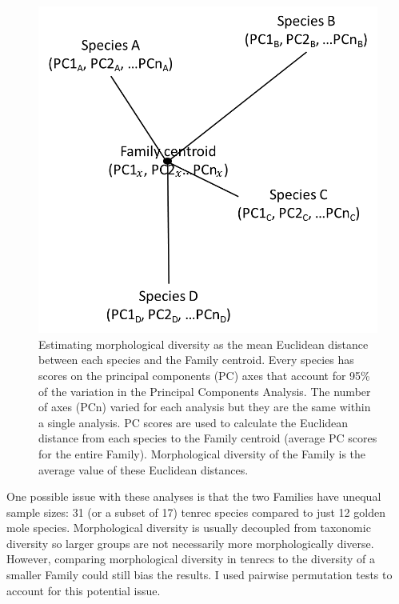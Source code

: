 	\begin{figure}[!htbp]
	\centering
	\includegraphics [width=0.7\linewidth, height=0.7\textheight, keepaspectratio]{Disparity/writing/figures/Centroids.png}
	\caption[Calculating diversity as mean Euclidean distance to Family centroid.]
		{Estimating morphological diversity as the mean Euclidean distance between each species and the Family centroid. Every species has scores on the principal components (PC) axes that account for 95\% of the variation in the Principal Components Analysis. The number of axes (PCn) varied for each analysis but they are the same within a single analysis. PC scores are used to calculate the Euclidean distance from each species to the Family centroid (average PC scores for the entire Family). Morphological diversity of the Family is the average value of these Euclidean distances.}
	\label{fig:centroids}
	\end{figure}
	
	
	One possible issue with these analyses is that the two Families have unequal sample sizes: 31 (or a subset of 17) tenrec species compared to just 12 golden mole species. Morphological diversity is usually decoupled from taxonomic diversity \citep[e.g.][]{Ruta2013, Hopkins2013} so larger groups are not necessarily more morphologically diverse. However, comparing morphological diversity in tenrecs to the diversity of a smaller Family could still bias the results. I used pairwise permutation tests to account for this potential issue. 

